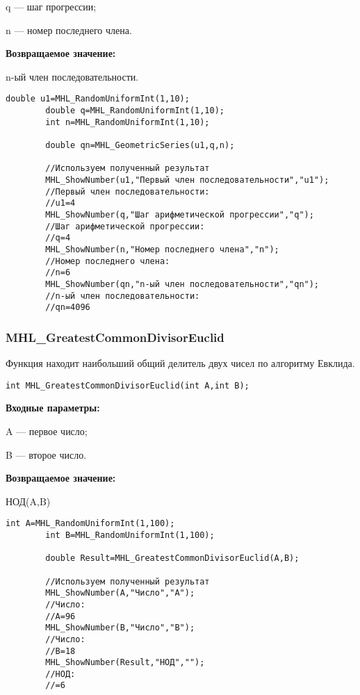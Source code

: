 \documentclass[a4paper,12pt]{article}
\begin{document}
q --- шаг  прогрессии;
 
n --- номер последнего члена.

\textbf{Возвращаемое значение:}
 
n-ый член последовательности.


\begin{lstlisting}[label=code_use_MHL_GeometricSeries,caption=Пример использования]
        double u1=MHL_RandomUniformInt(1,10);
        double q=MHL_RandomUniformInt(1,10);
        int n=MHL_RandomUniformInt(1,10);

        double qn=MHL_GeometricSeries(u1,q,n);

        //Используем полученный результат
        MHL_ShowNumber(u1,"Первый член последовательности","u1");
        //Первый член последовательности:
        //u1=4
        MHL_ShowNumber(q,"Шаг арифметической прогрессии","q");
        //Шаг арифметической прогрессии:
        //q=4
        MHL_ShowNumber(n,"Номер последнего члена","n");
        //Номер последнего члена:
        //n=6
        MHL_ShowNumber(qn,"n-ый член последовательности","qn");
        //n-ый член последовательности:
        //qn=4096
\end{lstlisting}

\subsubsection{MHL\_GreatestCommonDivisorEuclid}\label{MHL_GreatestCommonDivisorEuclid}

Функция находит наибольший общий делитель двух чисел по алгоритму Евклида.


\begin{lstlisting}[label=code_syntax_MHL_GreatestCommonDivisorEuclid,caption=Синтаксис]
int MHL_GreatestCommonDivisorEuclid(int A,int B);
\end{lstlisting}

\textbf{Входные параметры:}  
 
A --- первое число;
 
B --- второе число.

\textbf{Возвращаемое значение:}
 
НОД(A,B)


\begin{lstlisting}[label=code_use_MHL_GreatestCommonDivisorEuclid,caption=Пример использования]
        int A=MHL_RandomUniformInt(1,100);
        int B=MHL_RandomUniformInt(1,100);

        double Result=MHL_GreatestCommonDivisorEuclid(A,B);

        //Используем полученный результат
        MHL_ShowNumber(A,"Число","A");
        //Число:
        //A=96
        MHL_ShowNumber(B,"Число","B");
        //Число:
        //B=18
        MHL_ShowNumber(Result,"НОД","");
        //НОД:
        //=6
\end{lstlisting}
\end{document}
